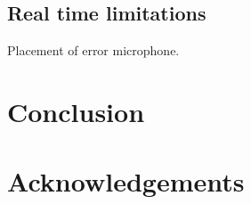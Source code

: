 






\subsection*{Real time limitations}
Placement of error microphone.



\section{Conclusion}

\section*{Acknowledgements}
